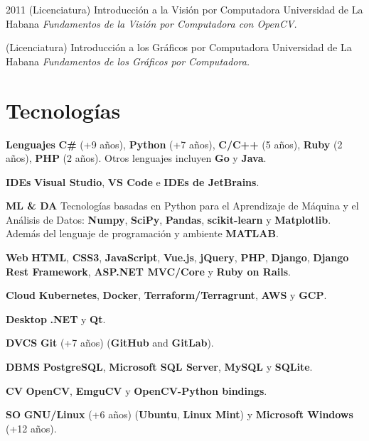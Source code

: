 \documentclass[]{friggeri-cv}
\begin{document}
\begin{entrylist}
  \entry
    {2011}
    {(Licenciatura) Introducción a la Visión por Computadora}
    {Universidad de La Habana}
    {\emph{Fundamentos de la Visión por Computadora con OpenCV.}}      

  \entry
    {}
    {(Licenciatura) Introducción a los Gráficos por Computadora}
    {Universidad de La Habana}
    {\emph{Fundamentos de los Gráficos por Computadora.}}
\end{entrylist}

\pagebreak

\section{Tecnologías}
\begin{entrylist}
  \entry
    {\textbf{Lenguajes}}
    {}
    {}
    {\textbf{C\#} (+9 años), \textbf{Python} (+7 años), \textbf{C/C++} (5 años), \textbf{Ruby} (2 años), \textbf{PHP} (2 años). Otros lenguajes incluyen \textbf{Go} y \textbf{Java}.}

  \entry
    {\textbf{IDEs}}
    {}
    {}
    {\textbf{Visual Studio}, \textbf{VS Code} e \textbf{IDEs de JetBrains}.}

  \entry
    {\textbf{ML \& DA}}
    {}
    {}
    {Tecnologías basadas en Python para el Aprendizaje de Máquina y el Análisis de Datos: \textbf{Numpy}, \textbf{SciPy}, \textbf{Pandas}, \textbf{scikit-learn} y \textbf{Matplotlib}. Además del lenguaje de programación y ambiente \textbf{MATLAB}.}

  \entry
    {\textbf{Web}}
    {}
    {}
    {\textbf{HTML}, \textbf{CSS3}, \textbf{JavaScript}, \textbf{Vue.js}, \textbf{jQuery}, \textbf{PHP}, \textbf{Django}, \textbf{Django Rest Framework}, \textbf{ASP.NET MVC/Core} y \textbf{Ruby on Rails}.}

  \entry
    {\textbf{Cloud}}
    {}
    {}
    {\textbf{Kubernetes}, \textbf{Docker}, \textbf{Terraform/Terragrunt}, \textbf{AWS} y \textbf{GCP}.}

  \entry
    {\textbf{Desktop}}
    {}
    {}
    {\textbf{.NET} y \textbf{Qt}.}
\end{entrylist}

\begin{entrylist}
  \entry
    {\textbf{DVCS}}
    {}
    {}
    {\textbf{Git} (+7 años) (\textbf{GitHub} and \textbf{GitLab}).}
    
  \entry
    {\textbf{DBMS}}
    {}
    {}
    {\textbf{PostgreSQL}, \textbf{Microsoft SQL Server}, \textbf{MySQL} y \textbf{SQLite}.}
    
  \entry
    {\textbf{CV}}
    {}
    {}
    {\textbf{OpenCV}, \textbf{EmguCV} y \textbf{OpenCV-Python bindings}.}    

  \entry
    {\textbf{SO}}
    {}
    {}
    {\textbf{GNU/Linux} (+6 años) (\textbf{Ubuntu}, \textbf{Linux Mint}) y \textbf{Microsoft Windows} (+12 años).}
\end{entrylist}
\end{document}

